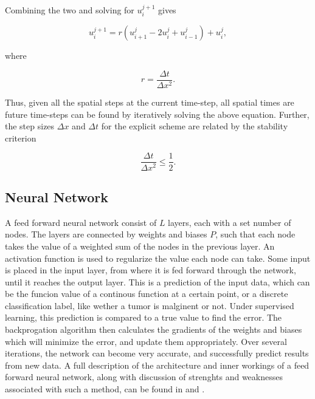 \documentclass[multicolumn, 10pt]{extarticle}
\begin{document}
Combining the two and solving for $u_{i}^{j+1}$ gives

\begin{equation}\label{eq:euler}
	u_{i}^{j+1} = r(u_{i+1}^{j} - 2u_{i}^{j} + u_{i-1}^{j}) + u_{i}^{j},
\end{equation}

where

\begin{equation*}
	r = \frac{\Delta t}{\Delta x^{2}}.
\end{equation*}

Thus, given all the spatial steps at the current time-step, all spatial times are future time-steps can be found by iteratively solving the above equation. Further, the step sizes $\Delta x$ and $\Delta t$ for the explicit scheme are related by the stability criterion

\begin{equation}\label{eq:stability_crit}
	\frac{\Delta t}{\Delta x^{2}} \le \frac{1}{2}.
\end{equation}

\subsection{Neural Network}
A feed forward neural network consist of $L$ layers, each with a set number of nodes. The layers are connected by weights and biases $P$, such that each node takes the value of a weighted sum of the nodes in the previous layer. An activation function is used to regularize the value each node can take. Some input is placed in the input layer, from where it is fed forward through the network, until it reaches the output layer. This is a prediction of the input data, which can be the funcion value of a continous function at a certain point, or a discrete classification label, like wether a tumor is malginent or not. Under supervised learning, this prediction is compared to a true value to find the error. The backprogation algorithm then calculates the gradients of the weights and biases which will minimize the error, and update them appropriately. Over several iterations, the network can become very accurate, and successfully predict results from new data. A full description of the architecture and inner workings of a feed forward neural network, along with discussion of strenghts and weaknesses associated with such a method, can be found in \cite{p2S} and \cite{p2HO}.
\end{document}
